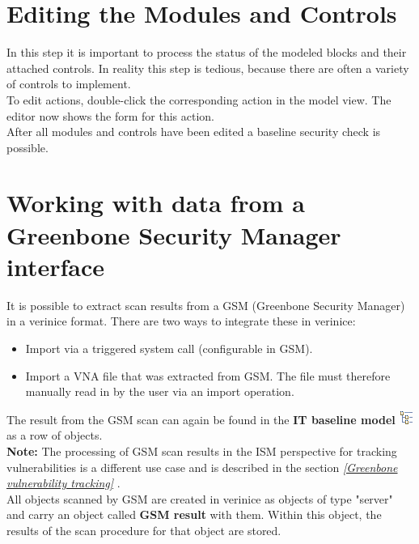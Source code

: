\documentclass[a4paper,10pt]{book}
\begin{document}
\section{Editing the Modules and Controls}
In this step it is important to process the status of the modeled blocks and their attached controls. In reality this step is tedious, because there are
often a variety of controls to implement.
\newline\\
To edit actions, double-click the corresponding action in the model view. The editor now shows the form for this action.
\newline\\
After all modules and controls have been edited a baseline security check is possible.

\section{Working with data from a Greenbone Security Manager interface} \label{sec:greenbone-sec-manager}
It is possible to extract scan results from a GSM (Greenbone Security Manager) in a verinice format.
There are two ways to integrate these in verinice:
 \begin{itemize}
   \item Import via a triggered system call (configurable in GSM).
   \item Import a VNA file that was extracted from GSM. The file must therefore manually read in by the user via an import operation.
 \end{itemize}
 The result from the GSM scan can again be found in the \textbf{IT baseline model \includegraphics[height=2ex]{Icon/GS_Modell.png}} as a row of objects.
 \newline\\
 \textbf{Note:} The processing of GSM scan results in the ISM
 perspective for tracking vulnerabilities is a different use case and is described in the section {\em \ref{Greenbone vulnerability tracking} \newline {}}.
 \newline\\
All objects scanned by GSM are created in verinice as objects of type
"server" and carry an object called \textbf{GSM result} with them.
Within this object, the results of the scan procedure for that object are stored.
\end{document}
